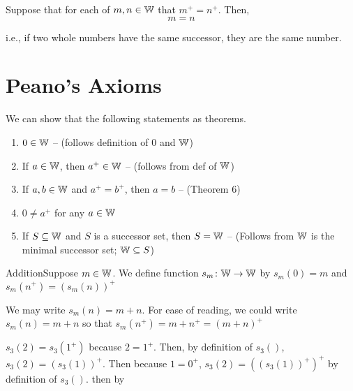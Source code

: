             \begin{theorem}
                Suppose that for each of \(m,n\in \mathbb{W}\) that \(m^+ = n^+\). Then, \[m = n\]
            \end{theorem}
            i.e., if two whole numbers have the same successor, they are the same number.

    \section{Peano's Axioms}

        We can show that the following statements as theorems. \\

        \begin{enumerate}
            \item \(0 \in \mathbb{W}\) -- (follows definition of \(0\) and \(\mathbb{W}\)) 
            \item If \(a\in \mathbb{W}\), then \(a^+ \in \mathbb{W}\) -- (follows from def of \(\mathbb{W}\))
            \item If \(a,b\in \mathbb{W}\) and \(a^+ = b^+\), then \(a = b\) -- (Theorem 6)
            \item \(0 \ne a^+\) for any \(a\in \mathbb{W}\)
            \item If \(S \subseteq \mathbb{W}\) and \(S\) is a successor set, then \(S = \mathbb{W}\) -- (Follows from \(\mathbb{W}\) is the minimal successor set; \(\mathbb{W} \subseteq S\))
        \end{enumerate}

\newpage 




    \vspace{0.5cm}

            \begin{definition}
                {Addition}Suppose \(m\in \mathbb{W}\). We define function \(s_m \colon \mathbb{W} \rightarrow \mathbb{W}\) by \(s_m(0) = m\) and \(s_m(n^+) = (s_m(n))^+\)

                We may write \(s_m(n) = m + n\). For ease of reading, we could write \(s_m(n) = m + n\) so that \(s_m(n^+) = m + n^+ = (m + n)^+\)
            \end{definition}

        \begin{example}
            \(s_3(2) = s_3(1^+)\) because \(2=1^+\). Then, by definition of \(s_3()\), \(s_3(2) = (s_3(1))^+\). Then because \(1 = 0^+\), \(s_3(2) = ((s_3(1))^+)^+\) by definition of \(s_3()\). then by 
        \end{example}

